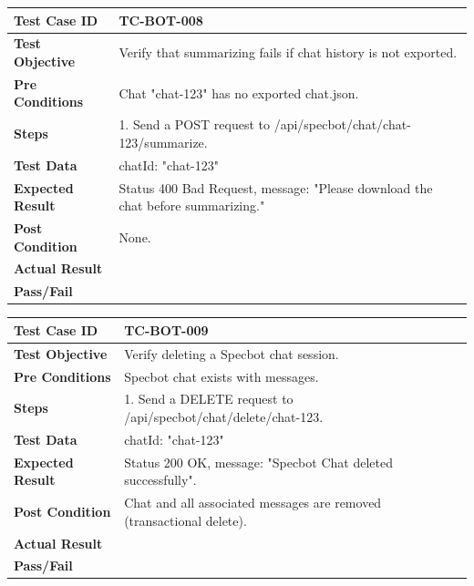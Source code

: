 \begin{longtable}{|p{}|p{}|}
\hline
\textbf{Test Case ID} & TC-BOT-008 \\ \hline
\textbf{Test Objective} & Verify that summarizing fails if chat history is not exported. \\ \hline
\textbf{Pre Conditions} & Chat "chat-123" has no exported chat.json. \\ \hline
\textbf{Steps} & 
1. Send a POST request to /api/specbot/chat/chat-123/summarize. \\ \hline
\textbf{Test Data} & chatId: "chat-123" \\ \hline
\textbf{Expected Result} & Status 400 Bad Request, message: "Please download the chat before summarizing." \\ \hline
\textbf{Post Condition} & None. \\ \hline
\textbf{Actual Result} &  \\ \hline
\textbf{Pass/Fail} &  \\ \hline
\end{longtable}

\begin{longtable}{|p{}|p{}|}
\hline
\textbf{Test Case ID} & TC-BOT-009 \\ \hline
\textbf{Test Objective} & Verify deleting a Specbot chat session. \\ \hline
\textbf{Pre Conditions} & Specbot chat exists with messages. \\ \hline
\textbf{Steps} & 
1. Send a DELETE request to /api/specbot/chat/delete/chat-123. \\ \hline
\textbf{Test Data} & chatId: "chat-123" \\ \hline
\textbf{Expected Result} & Status 200 OK, message: "Specbot Chat deleted successfully". \\ \hline
\textbf{Post Condition} & Chat and all associated messages are removed (transactional delete). \\ \hline
\textbf{Actual Result} &  \\ \hline
\textbf{Pass/Fail} &  \\ \hline
\end{longtable}

